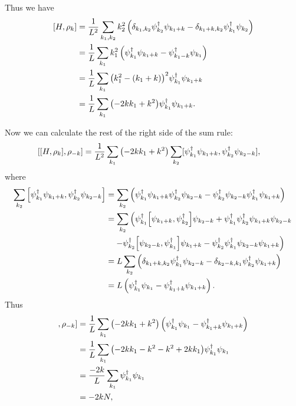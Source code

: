 \documentclass[11pt, a4paper]{report} %
\begin{document}
Thus we have
\begin{align}
  \label{eq:13}
  [H, \rho_k] &= \frac{1}{L^2} \sum_{k_1,k_2} k_2^2  \left( \delta_{k_1,k_2} \psi_{k_2}^{\dag}\psi_{k_1+k} -  \delta_{k_1+k,k_2}\psi_{k_1}^{\dag}\psi_{k_2} \right) \\
              &= \frac{1}{L} \sum_{k_1} k_1^2  \left(\psi_{k_1}^{\dag}\psi_{k_1+k} -  \psi_{k_1-k}^{\dag}\psi_{k_1} \right) \\
              &= \frac{1}{L} \sum_{k_1} {\qty(k_1^2 -(k_1+k))}^2 \psi_{k_1}^{\dag}\psi_{k_1+k}\\
              &= \frac{1}{L} \sum_{k_1} \qty(-2kk_1+k^2) \psi_{k_1}^{\dag}\psi_{k_1+k}.
\end{align}

Now we can calculate the rest of the right side of the sum rule:
\begin{align}
  \label{eq:14}
  [[H,\rho_k],\rho_{-k}] &= \frac{1}{L^2} \sum_{k_1}\qty(-2kk_1+k^2) \sum_{k_2} [\psi_{k_1}^{\dag}\psi_{k_1+k}, \psi_{k_2}^{\dag}\psi_{k_2-k}],
\end{align}
where
\begin{align}
  \label{eq:15}
   \sum_{k_2} \qty[\psi_{k_1}^{\dag}\psi_{k_1+k}, \psi_{k_2}^{\dag}\psi_{k_2-k}] &=  \sum_{k_2} \left(\psi_{k_1}^{\dag}\psi_{k_1+k} \psi_{k_2}^{\dag}\psi_{k_2-k} - \psi_{k_2}^{\dag}\psi_{k_2-k}\psi_{k_1}^{\dag}\psi_{k_1+k} \right)\\
                                                                             &= \sum_{k_2} \left(\psi_{k_1}^{\dag}\qty[\psi_{k_1+k}, \psi_{k_2}^{\dag}]\psi_{k_2-k} + \psi_{k_1}^{\dag} \psi_{k_2}^{\dag}\psi_{k_1+k}\psi_{k_2-k} \right.\nonumber\\
&\quad\left. - \psi_{k_2}^{\dag}\qty[\psi_{k_2-k},\psi_{k_1}^{\dag}]\psi_{k_1+k} -\psi_{k_2}^{\dag}\psi_{k_1}^{\dag}\psi_{k_2-k}\psi_{k_1+k} \right) \\
                                                                             &= L\sum_{k_2} \left(\delta_{k_1+k,k_2}\psi_{k_1}^{\dag}\psi_{k_2-k} - \delta_{k_2-k,k_1}\psi_{k_2}^{\dag}\psi_{k_1+k}\right) \\
                                                                             &= L \left(\psi_{k_1}^{\dag}\psi_{k_1} - \psi_{k_1+k}^{\dag}\psi_{k_1+k}\right) .
\end{align}
Thus
\begin{align}
  [[H,\rho_k],\rho_{-k}] &= \frac{1}{L} \sum_{k_1}\qty(-2kk_1+k^2) \left(\psi_{k_1}^{\dag}\psi_{k_1} - \psi_{k_1+k}^{\dag}\psi_{k_1+k}\right) \\
                         &=  \frac{1}{L} \sum_{k_1}\qty(-2kk_1-k^2 -k^2+2kk_1) \psi_{k_1}^{\dag}\psi_{k_1}\\
                         &=  \frac{-2k}{L} \sum_{k_1}\psi_{k_1}^{\dag}\psi_{k_1}\\
                         &= -2kN,
\end{align}
\end{document}
